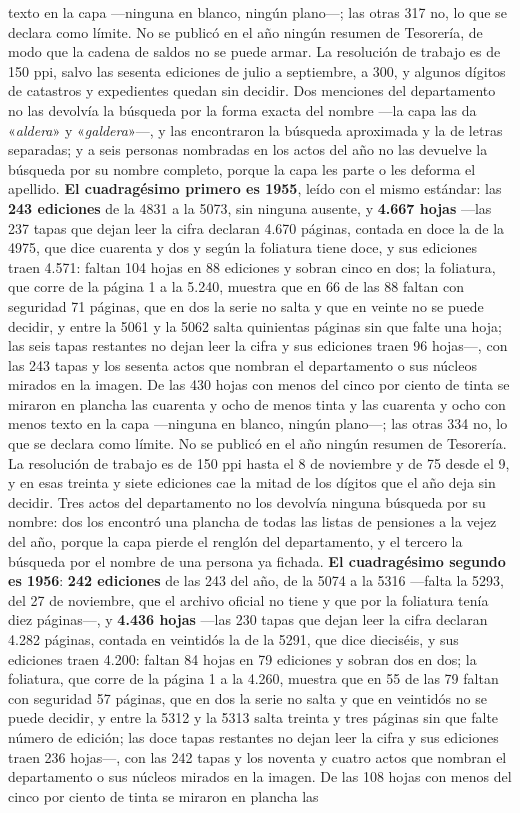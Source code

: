 texto en la capa ---ninguna en blanco, ningún plano---; las otras 317 no, lo que se declara como límite. No se publicó en el año ningún resumen de Tesorería, de modo que la cadena de saldos no se puede armar. La resolución de trabajo es de 150 ppi, salvo las sesenta ediciones de julio a septiembre, a 300, y algunos dígitos de catastros y expedientes quedan sin decidir. Dos menciones del departamento no las devolvía la búsqueda por la forma exacta del nombre ---la capa las da «\textit{aldera}» y «\textit{galdera}»---, y las encontraron la búsqueda aproximada y la de letras separadas; y a seis personas nombradas en los actos del año no las devuelve la búsqueda por su nombre completo, porque la capa les parte o les deforma el apellido. \textbf{El cuadragésimo primero es 1955}, leído con el mismo estándar: las \textbf{243 ediciones} de la 4831 a la 5073, sin ninguna ausente, y \textbf{4.667 hojas} ---las 237 tapas que dejan leer la cifra declaran 4.670 páginas, contada en doce la de la 4975, que dice cuarenta y dos y según la foliatura tiene doce, y sus ediciones traen 4.571: faltan 104 hojas en 88 ediciones y sobran cinco en dos; la foliatura, que corre de la página 1 a la 5.240, muestra que en 66 de las 88 faltan con seguridad 71 páginas, que en dos la serie no salta y que en veinte no se puede decidir, y entre la 5061 y la 5062 salta quinientas páginas sin que falte una hoja; las seis tapas restantes no dejan leer la cifra y sus ediciones traen 96 hojas---, con las 243 tapas y los sesenta actos que nombran el departamento o sus núcleos mirados en la imagen. De las 430 hojas con menos del cinco por ciento de tinta se miraron en plancha las cuarenta y ocho de menos tinta y las cuarenta y ocho con menos texto en la capa ---ninguna en blanco, ningún plano---; las otras 334 no, lo que se declara como límite. No se publicó en el año ningún resumen de Tesorería. La resolución de trabajo es de 150 ppi hasta el 8 de noviembre y de 75 desde el 9, y en esas treinta y siete ediciones cae la mitad de los dígitos que el año deja sin decidir. Tres actos del departamento no los devolvía ninguna búsqueda por su nombre: dos los encontró una plancha de todas las listas de pensiones a la vejez del año, porque la capa pierde el renglón del departamento, y el tercero la búsqueda por el nombre de una persona ya fichada. \textbf{El cuadragésimo segundo es 1956}: \textbf{242 ediciones} de las 243 del año, de la 5074 a la 5316 ---falta la 5293, del 27 de noviembre, que el archivo oficial no tiene y que por la foliatura tenía diez páginas---, y \textbf{4.436 hojas} ---las 230 tapas que dejan leer la cifra declaran 4.282 páginas, contada en veintidós la de la 5291, que dice dieciséis, y sus ediciones traen 4.200: faltan 84 hojas en 79 ediciones y sobran dos en dos; la foliatura, que corre de la página 1 a la 4.260, muestra que en 55 de las 79 faltan con seguridad 57 páginas, que en dos la serie no salta y que en veintidós no se puede decidir, y entre la 5312 y la 5313 salta treinta y tres páginas sin que falte número de edición; las doce tapas restantes no dejan leer la cifra y sus ediciones traen 236 hojas---, con las 242 tapas y los noventa y cuatro actos que nombran el departamento o sus núcleos mirados en la imagen. De las 108 hojas con menos del cinco por ciento de tinta se miraron en plancha las 